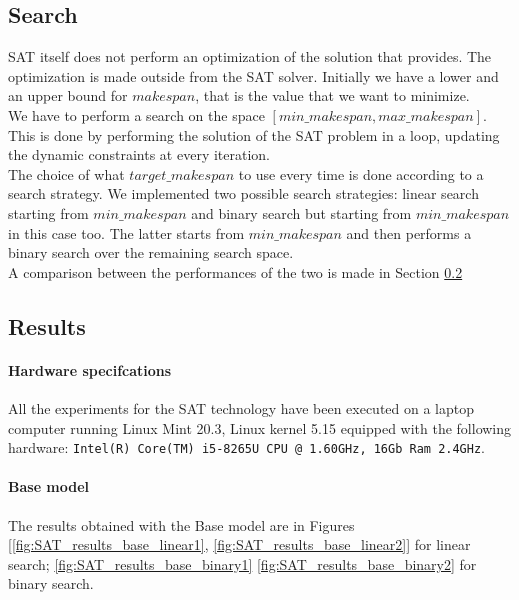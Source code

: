 
\subsection{Search}\label{subsec:SAT_search}
  SAT itself does not perform an optimization of the solution that provides.
  The optimization is made outside from the SAT solver. Initially we have a lower and an upper bound
  for \(makespan\), that is the value that we want to minimize.\\

  We have to perform a search on the space \([min\_makespan, max\_makespan]\). This is done by performing
  the solution of the SAT problem in a loop, updating the dynamic constraints at every iteration.\\

  The choice of what \(target\_makespan\) to use every time is done according to a search strategy.
  We implemented two possible search strategies: linear search starting from \(min\_makespan\) and
  binary search but starting from \(min\_makespan\) in this case too.
  The latter starts from \(min\_makespan\) and then performs a binary search over the remaining
  search space.\\

  A comparison between the performances of the two is made in Section \ref{subsec:SAT_results}


\subsection{Results}\label{subsec:SAT_results}

  \paragraph{Hardware specifcations}
    All the experiments for the SAT technology have been executed on a laptop computer running Linux Mint 20.3, Linux kernel 5.15
    equipped with the following hardware:
    \texttt{Intel(R) Core(TM) i5-8265U CPU @ 1.60GHz, 16Gb Ram 2.4GHz}.\\

  \paragraph{Base model}
    The results obtained with the Base model are in Figures [\ref{fig:SAT_results_base_linear1}, \ref{fig:SAT_results_base_linear2}]
    for linear search; \ref{fig:SAT_results_base_binary1} \ref{fig:SAT_results_base_binary2} for binary search.

